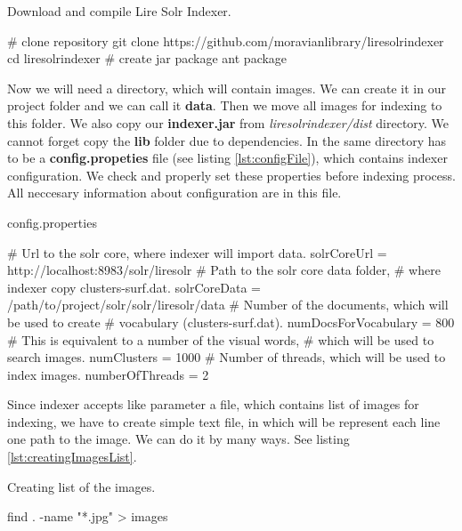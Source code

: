 \documentclass[12pt,a4paper]{report}
\begin{document}
\begin{listing}[H]
\caption{Download and compile Lire Solr Indexer.}
\label{lst:liresolrindexer}
\begin{bashcode}
# clone repository
git clone https://github.com/moravianlibrary/liresolrindexer
cd liresolrindexer
# create jar package
ant package
\end{bashcode}
\end{listing}

Now we will need a directory, which will contain images. We can create it in our project folder and we can call it \textbf{data}. Then we move all images for indexing to this folder. We also copy our \textbf{indexer.jar} from \textit{liresolrindexer/dist} directory. We cannot forget copy the \textbf{lib} folder due to dependencies. In the same directory has to be a \textbf{config.propeties} file (see listing \ref{lst:configFile}), which contains indexer configuration. We check and properly set these properties before indexing process. All neccesary information about configuration are in this file.

\begin{listing}[H]
\caption{config.properties}
\label{lst:configFile}
\begin{propertiescode}
# Url to the solr core, where indexer will import data.
solrCoreUrl = http://localhost:8983/solr/liresolr
# Path to the solr core data folder,
# where indexer copy clusters-surf.dat.
solrCoreData = /path/to/project/solr/solr/liresolr/data
# Number of the documents, which will be used to create
# vocabulary (clusters-surf.dat).
numDocsForVocabulary = 800
# This is equivalent to a number of the visual words,
# which will be used to search images.
numClusters = 1000
# Number of threads, which will be used to index images.
numberOfThreads = 2
\end{propertiescode}
\end{listing}

Since indexer accepts like parameter a file, which contains list of images for indexing, we have to create simple text file, in which will be represent each line one path to the image. We can do it by many ways. See listing \ref{lst:creatingImagesList}.

\begin{listing}[H]
\caption{Creating list of the images.}
\label{lst:creatingImagesList}
\begin{bashcode}
find . -name "*.jpg" > images
\end{bashcode}
\end{listing}
\end{document}
